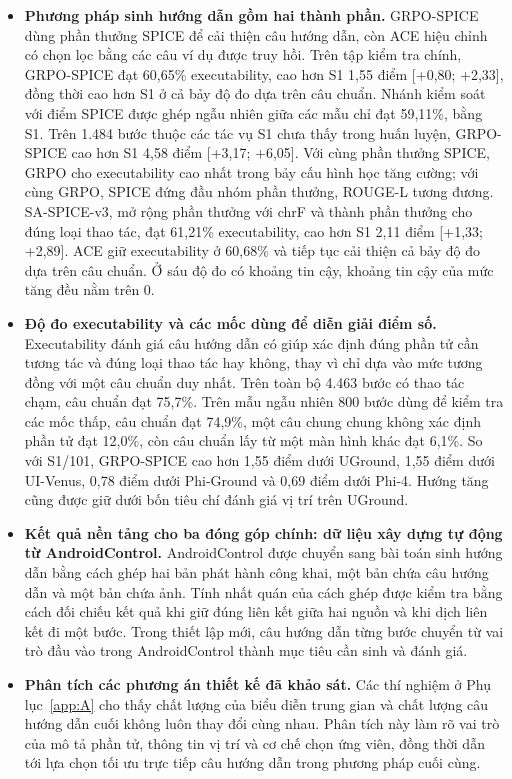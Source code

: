 \begin{itemize}
\item \textbf{Phương pháp sinh hướng dẫn gồm hai thành phần.} GRPO-SPICE dùng phần thưởng SPICE để cải thiện câu hướng dẫn, còn ACE hiệu chỉnh có chọn lọc bằng các câu ví dụ được truy hồi. Trên tập kiểm tra chính, GRPO-SPICE đạt 60,65\% executability, cao hơn S1 1,55 điểm [+0,80; +2,33], đồng thời cao hơn S1 ở cả bảy độ đo dựa trên câu chuẩn. Nhánh kiểm soát với điểm SPICE được ghép ngẫu nhiên giữa các mẫu chỉ đạt 59,11\%, bằng S1. Trên 1.484 bước thuộc các tác vụ S1 chưa thấy trong huấn luyện, GRPO-SPICE cao hơn S1 4,58 điểm [+3,17; +6,05]. Với cùng phần thưởng SPICE, GRPO cho executability cao nhất trong bảy cấu hình học tăng cường; với cùng GRPO, SPICE đứng đầu nhóm phần thưởng, ROUGE-L tương đương. SA-SPICE-v3, mở rộng phần thưởng với chrF và thành phần thưởng cho đúng loại thao tác, đạt 61,21\% executability, cao hơn S1 2,11 điểm [+1,33; +2,89]. ACE giữ executability ở 60,68\% và tiếp tục cải thiện cả bảy độ đo dựa trên câu chuẩn. Ở sáu độ đo có khoảng tin cậy, khoảng tin cậy của mức tăng đều nằm trên 0.
\item \textbf{Độ đo executability và các mốc dùng để diễn giải điểm số.} Executability đánh giá câu hướng dẫn có giúp xác định đúng phần tử cần tương tác và đúng loại thao tác hay không, thay vì chỉ dựa vào mức tương đồng với một câu chuẩn duy nhất. Trên toàn bộ 4.463 bước có thao tác chạm, câu chuẩn đạt 75,7\%. Trên mẫu ngẫu nhiên 800 bước dùng để kiểm tra các mốc thấp, câu chuẩn đạt 74,9\%, một câu chung chung không xác định phần tử đạt 12,0\%, còn câu chuẩn lấy từ một màn hình khác đạt 6,1\%. So với S1/101, GRPO-SPICE cao hơn 1,55 điểm dưới UGround, 1,55 điểm dưới UI-Venus, 0,78 điểm dưới Phi-Ground và 0,69 điểm dưới Phi-4. Hướng tăng cũng được giữ dưới bốn tiêu chí đánh giá vị trí trên UGround.
\item \textbf{Kết quả nền tảng cho ba đóng góp chính: dữ liệu xây dựng tự động từ AndroidControl.} AndroidControl được chuyển sang bài toán sinh hướng dẫn bằng cách ghép hai bản phát hành công khai, một bản chứa câu hướng dẫn và một bản chứa ảnh. Tính nhất quán của cách ghép được kiểm tra bằng cách đối chiếu kết quả khi giữ đúng liên kết giữa hai nguồn và khi dịch liên kết đi một bước. Trong thiết lập mới, câu hướng dẫn từng bước chuyển từ vai trò đầu vào trong AndroidControl thành mục tiêu cần sinh và đánh giá.
\item \textbf{Phân tích các phương án thiết kế đã khảo sát.} Các thí nghiệm ở Phụ lục~\ref{app:A} cho thấy chất lượng của biểu diễn trung gian và chất lượng câu hướng dẫn cuối không luôn thay đổi cùng nhau. Phân tích này làm rõ vai trò của mô tả phần tử, thông tin vị trí và cơ chế chọn ứng viên, đồng thời dẫn tới lựa chọn tối ưu trực tiếp câu hướng dẫn trong phương pháp cuối cùng.
\end{itemize}

